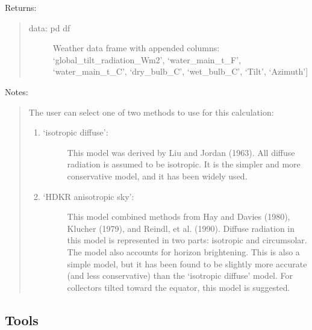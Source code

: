 \documentclass[letterpaper,10pt,english,openany]{sphinxmanual}
\begin{document}
\begin{fulllineitems}
\begin{fulllineitems}
Returns:
\begin{quote}
\begin{description}
\item[{data: pd df}] \leavevmode
Weather data frame with appended columns:
‘global\_tilt\_radiation\_Wm2’, ‘water\_main\_t\_F’,
‘water\_main\_t\_C’, ‘dry\_bulb\_C’, ‘wet\_bulb\_C’, ‘Tilt’,
‘Azimuth’{]}

\end{description}
\end{quote}

Notes:
\begin{quote}

The user can select one of two methods to use for
this calculation:
\begin{enumerate}
\def\theenumi{\arabic{enumi}}
\def\labelenumi{\theenumi )}
\makeatletter\def\p@enumii{\p@enumi \theenumi )}\makeatother
\item {} \begin{description}
\item[{‘isotropic diffuse’:}] \leavevmode
This model was derived by Liu and Jordan (1963).
All diffuse radiation is assumed to be isotropic.
It is the simpler and more conservative model,
and it has been widely used.

\end{description}

\item {} \begin{description}
\item[{‘HDKR anisotropic sky’:}] \leavevmode
This model combined methods from Hay and Davies (1980),
Klucher (1979), and Reindl, et al. (1990).
Diffuse radiation in this model is represented in two
parts: isotropic and circumsolar. The model also accounts
for horizon brightening.
This is also a simple model, but it has been found to be
slightly more accurate (and less conservative) than the
‘isotropic diffuse’ model.  For collectors tilted toward
the equator, this model is suggested.

\end{description}

\end{enumerate}
\end{quote}

\end{fulllineitems}


\end{fulllineitems}



\subsection{Tools}
\label{\detokenize{source/mswh.tools:tools}}\label{\detokenize{source/mswh.tools::doc}}
\end{document}
